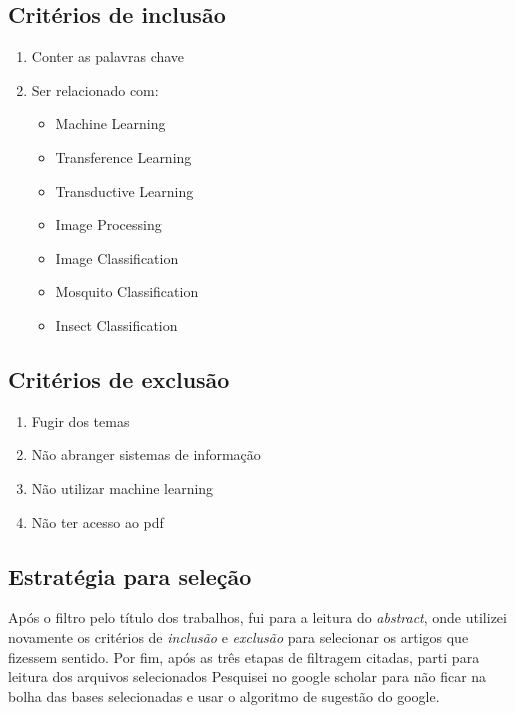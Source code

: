 \documentclass{article}
\begin{document}
\subsection{Critérios de inclusão}
\label{cap:crit_inclusao}
\begin{enumerate}
    \item Conter as palavras chave
    \item Ser relacionado com: 
    \begin{itemize}
        \item Machine Learning
        \item Transference Learning
        \item Transductive Learning
        \item Image Processing
        \item Image Classification
        \item Mosquito Classification
        \item Insect Classification
    \end{itemize}
\end{enumerate}

\subsection{Critérios de exclusão}
\label{cap:crit_exclusao}
\begin{enumerate}
    \item Fugir dos temas
    \item Não abranger sistemas de informação
    \item Não utilizar machine learning
    \item Não ter acesso ao pdf 
\end{enumerate}


\subsection{Estratégia para seleção}
Após o filtro pelo título dos trabalhos, fui para a leitura do \emph{abstract}, onde utilizei novamente os critérios de \emph{inclusão} e \emph{exclusão} para selecionar os artigos que fizessem sentido. Por fim, após as três etapas de filtragem citadas, parti para leitura dos arquivos selecionados
Pesquisei no google scholar para não ficar na bolha das bases selecionadas e usar o algoritmo de sugestão do google.
\end{document}
